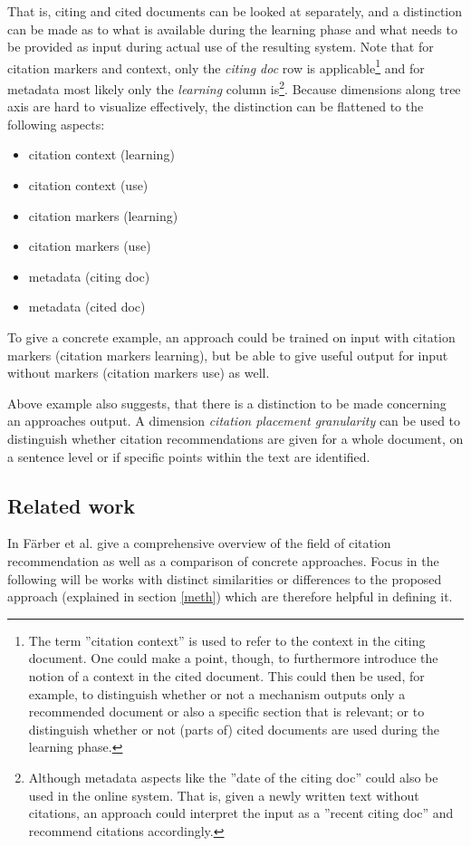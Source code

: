 \documentclass{proseminar}
\begin{document}
That is, citing and cited documents can be looked at separately, and a distinction can be made as to what is available during the learning phase and what needs to be provided as input during actual use of the resulting system. Note that for citation markers and context, only the \emph{citing doc} row is applicable\footnote{The term ''citation context'' is used to refer to the context in the citing document. One could make a point, though, to furthermore introduce the notion of a context in the cited document. This could then be used, for example, to distinguish whether or not a mechanism outputs only a recommended document or also a specific section that is relevant; or to distinguish whether or not (parts of) cited documents are used during the learning phase.} and for metadata most likely only the \emph{learning} column is\footnote{Although metadata aspects like the ''date of the citing doc'' could also be used in the online system. That is, given a newly written text without citations, an approach could interpret the input as a ''recent citing doc'' and recommend citations accordingly.}. Because dimensions along tree axis are hard to visualize effectively, the distinction can be flattened to the following aspects:

\begin{itemize}
    \item citation context (learning)
    \item citation context (use)
    \item citation markers (learning)
    \item citation markers (use)
    \item metadata (citing doc)
    \item metadata (cited doc)
\end{itemize}

To give a concrete example, an approach could be trained on input with citation markers (citation markers learning),  but be able to give useful output for input without markers (citation markers use) as well.

Above example also suggests, that there is a distinction to be made concerning an approaches output. A dimension \emph{citation placement granularity} can be used to distinguish whether citation recommendations are given for a whole document, on a sentence level or if specific points within the text are identified.

\subsection{Related work}
In \cite{Faerber} F\"arber et al. give a comprehensive overview of the field of citation recommendation as well as a comparison of concrete approaches. Focus in the following will be works with distinct similarities or differences to the proposed approach (explained in section \ref{meth}) which are therefore helpful in defining it.
\end{document}
